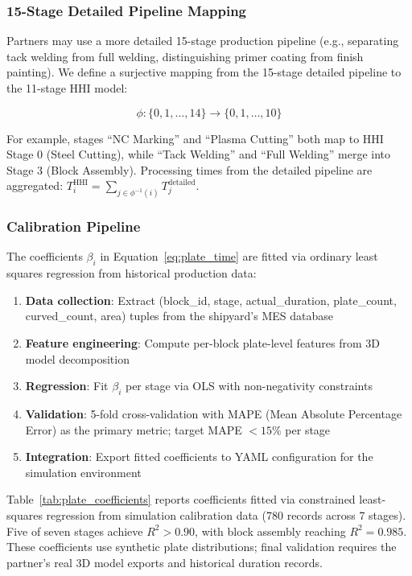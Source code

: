 \documentclass[11pt,a4paper]{article}
\begin{document}
\subsubsection{15-Stage Detailed Pipeline Mapping}

Partners may use a more detailed 15-stage production pipeline (e.g., separating tack welding from full welding, distinguishing primer coating from finish painting). We define a surjective mapping from the 15-stage detailed pipeline to the 11-stage HHI model:

\begin{equation}
\phi: \{0, 1, \ldots, 14\} \to \{0, 1, \ldots, 10\}
\end{equation}

\noindent For example, stages ``NC Marking'' and ``Plasma Cutting'' both map to HHI Stage 0 (Steel Cutting), while ``Tack Welding'' and ``Full Welding'' merge into Stage 3 (Block Assembly). Processing times from the detailed pipeline are aggregated: $T_i^{\text{HHI}} = \sum_{j \in \phi^{-1}(i)} T_j^{\text{detailed}}$.

\subsubsection{Calibration Pipeline}

The coefficients $\beta_i$ in Equation~\ref{eq:plate_time} are fitted via ordinary least squares regression from historical production data:

\begin{enumerate}
    \item \textbf{Data collection}: Extract (block\_id, stage, actual\_duration, plate\_count, curved\_count, area) tuples from the shipyard's MES database
    \item \textbf{Feature engineering}: Compute per-block plate-level features from 3D model decomposition
    \item \textbf{Regression}: Fit $\beta_i$ per stage via OLS with non-negativity constraints
    \item \textbf{Validation}: 5-fold cross-validation with MAPE (Mean Absolute Percentage Error) as the primary metric; target MAPE $< 15\%$ per stage
    \item \textbf{Integration}: Export fitted coefficients to YAML configuration for the simulation environment
\end{enumerate}

\noindent Table~\ref{tab:plate_coefficients} reports coefficients fitted via constrained least-squares regression from simulation calibration data (780 records across 7 stages). Five of seven stages achieve $R^2 > 0.90$, with block assembly reaching $R^2 = 0.985$. These coefficients use synthetic plate distributions; final validation requires the partner's real 3D model exports and historical duration records.
\end{document}
